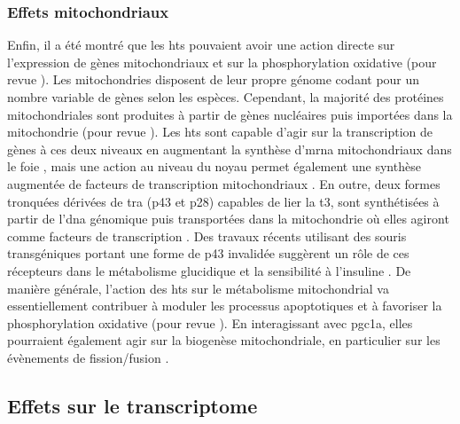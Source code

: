 \documentclass[../main.tex]{subfiles}
\begin{document}
		\subsubsection{Effets mitochondriaux}
			Enfin, il a été montré que les \glspl{ht} pouvaient avoir une action directe sur l'expression de gènes mitochondriaux et sur la phosphorylation oxidative (pour revue \citealp{Wrutniak-Cabello2001}).
			Les mitochondries disposent de leur propre génome codant pour un nombre variable de gènes selon les espèces.
			Cependant, la majorité des protéines mitochondriales sont produites à partir de gènes nucléaires puis importées dans la mitochondrie (pour revue \citealp{Schaffer2007}).
			Les \glspl{ht} sont capable d'agir sur la transcription de gènes à ces deux niveaux en augmentant la synthèse d’\gls{mrna} mitochondriaux dans le foie \citep{Enriquez1999}, mais une action au niveau du noyau permet également une synthèse augmentée de facteurs de transcription mitochondriaux \citep{Garstka1994}.
			En outre, deux formes tronquées dérivées de \gls{tra} (p43 et p28) capables de lier la \gls{t3}, sont synthétisées à partir de l'\gls{dna} génomique puis transportées dans la mitochondrie où elles agiront comme facteurs de transcription \citep{Wrutniak1995}.
			Des travaux récents utilisant des souris transgéniques portant une forme de p43 invalidée suggèrent un rôle de ces récepteurs dans le métabolisme glucidique et la sensibilité à l'insuline \citep{Bertrand2013}.
			De manière générale, l'action des \glspl{ht} sur le métabolisme mitochondrial va essentiellement contribuer à moduler les processus apoptotiques et à favoriser la phosphorylation oxidative (pour revue \citealp{Psarra2008}).
			En interagissant avec \gls{pgc1a}, elles pourraient également agir sur la biogenèse mitochondriale, en particulier sur les évènements de fission/fusion \citep{Ventura-Clapier2008}.


	\subsection{Effets sur le transcriptome}
\end{document}
